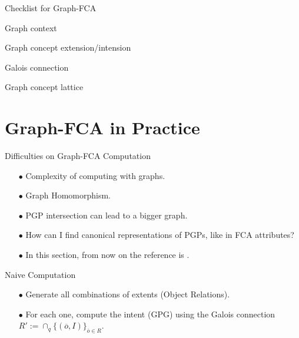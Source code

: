 \documentclass[pdf,xcolor=table]{beamer}
\newcommand{\cmark}{\ding{51}}%
\newcommand{\done}{\rlap{$\square$}{\raisebox{2pt}{\large\hspace{1pt}\cmark}}%
\hspace{-2.5pt}}
\begin{document}
\begin{frame}[t]{Checklist for Graph-FCA}
    \begin{todolist}
        \item[\done] Graph context
        \item[\done] Graph concept extension/intension
        \item[\done] Galois connection
        \item[\done] Graph concept lattice
    \end{todolist}
\end{frame}

\section{Graph-FCA in Practice}
\begin{frame}[t]{Difficulties on Graph-FCA Computation}
    \begin{itemize}
        \item[$\bullet$] Complexity of computing with graphs.
        \item[$\bullet$] Graph Homomorphism.
        \item[$\bullet$] PGP intersection can lead to a bigger graph.
        \item[$\bullet$] How can I find canonical representations of PGPs, like in FCA attributes?
        \item[$\bullet$] In this section, from now on the reference is \cite{Ferre2016}.
    \end{itemize}
\end{frame}

\begin{frame}[t]{Naive Computation}
    \begin{itemize}
        \item[$\bullet$] Generate all combinations of extents (Object Relations).
        \item[$\bullet$] For each one, compute the intent (GPG) using the Galois connection $R' := \cap_q\{(\overline{o}, I)\}_{\overline{o} \in R}$.
    \end{itemize}
\end{frame}
\end{document}
